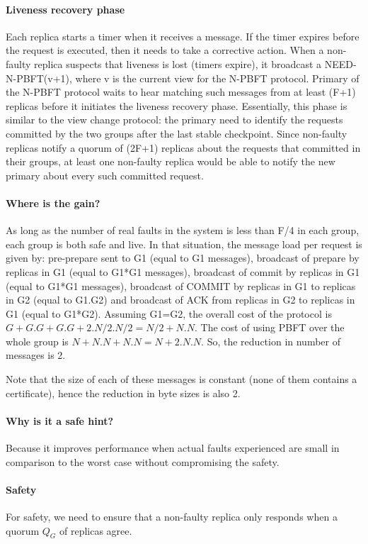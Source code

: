 \documentclass[twocolumn,10pt]{article}
\begin{document}
\paragraph{Liveness recovery phase} Each replica starts a timer when it receives a message. If the timer expires before the
request is executed, then it needs to take a corrective action. When a
non-faulty replica suspects that liveness is lost (timers expire), it broadcast a NEED-N-PBFT(v+1), where v is the current
view for the N-PBFT protocol. Primary of the N-PBFT
protocol waits to hear matching such messages from at least (F+1) replicas before it initiates the liveness recovery phase. Essentially,
this phase is similar to the view change protocol: the primary need to identify the requests committed by the two groups after the last
stable checkpoint. Since non-faulty replicas notify a quorum of (2F+1) replicas about the requests that committed in their groups, at 
least one non-faulty replica would be able to notify the new primary about every such committed request.   


\paragraph{Where is the gain?} As long as the number of real faults in the system is less than F/4 in each group,
each group is both safe and live. In that situation, the message load per request is given by: pre-prepare sent to 
G1 (equal to G1 messages), broadcast of prepare by replicas in G1 (equal to G1*G1 messages), broadcast of commit by
replicas in G1 (equal to G1*G1 messages), broadcast of COMMIT
by replicas in G1 to replicas in G2 (equal to G1.G2) and broadcast of ACK from  replicas in G2 to replicas in G1
(equal to G1*G2). Assuming G1=G2, the overall cost of the protocol is $G+G.G+G.G + 2.N/2.N/2=N/2+N.N$. The cost of using PBFT over the whole group is $N+N.N + N.N=N+2.N.N$. So, the reduction in number of messages is 2.

Note that the size of each of these messages is constant (none of them contains a certificate), hence the reduction
in byte sizes is also 2.

\paragraph{Why is it a safe hint?} Because it improves performance when actual faults experienced are small in
comparison to the worst case without compromising the safety.

\paragraph{Safety} For safety, we need to ensure that a non-faulty replica only responds when a quorum $Q_G$ of replicas agree. 
\end{document}
